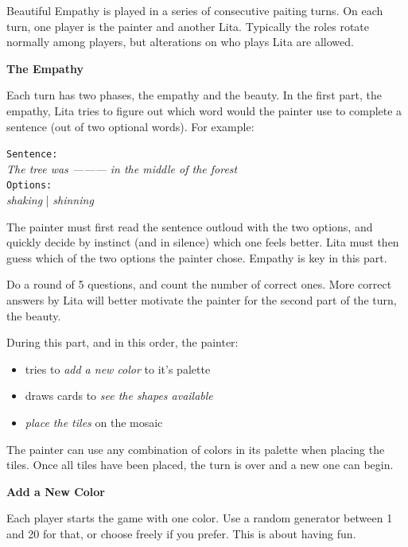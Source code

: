\documentclass[twocolumn]{article}
\newcommand{\lvl}[1]{\vspace{0.5cm}\Large{\textbf{#1}}\vspace{0.2cm}}
\begin{document}
Beautiful Empathy is played in a series of consecutive paiting turns. On each turn, one player is the painter and another Lita. Typically the roles rotate normally among players, but alterations on who plays Lita are allowed. 

\vspace{1cm}
\lvl{The Empathy}

Each turn has two phases, the empathy and the beauty. In the first part, the empathy, Lita tries to figure out which word would the painter use to complete a sentence (out of two optional words). For example:

\begin{centering}
\texttt{Sentence:}\\
\textit{The tree was --------- in the middle of the forest}\\
\texttt{Options:}\\
\textit{shaking} | \textit{shinning}\\
\end{centering}
\vspace{0.5cm}

The painter must first read the sentence outloud with the two options, and quickly decide by instinct (and in silence) which one feels better. Lita must then guess which of the two options the painter chose. Empathy is key in this part.

Do a round of 5 questions, and count the number of correct ones. More correct answers by Lita will better motivate the painter for the second part of the turn, the beauty. 

During this part, and in this order, the painter:
\begin{itemize}
 \item tries to \textit{add a new color} to it's palette
 \item draws cards to \textit{see the shapes available}
 \item \textit{place the tiles} on the mosaic
\end{itemize}

The painter can use any combination of colors in its palette when placing the tiles. Once all tiles have been placed, the turn is over and a new one can begin.

\lvl{Add a New Color}

Each player starts the game with one color. Use a random generator between 1 and 20 for that, or choose freely if you prefer. This is about having fun.
\end{document}
